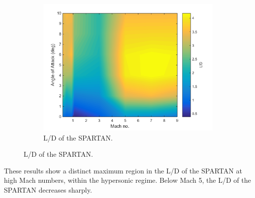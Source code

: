 \begin{figure}
\begin{subfigure}{.5\textwidth}
\centering
\includegraphics[width=0.99\linewidth]{figures/3_vehicle_design/LD}
\caption{L/D of the SPARTAN.}
\label{fig:LD}
\end{subfigure}
\end{figure}


These results show a distinct maximum region in the L/D of the SPARTAN at high Mach numbers, within the hypersonic regime. Below Mach 5, the L/D of the SPARTAN decreases sharply. 

